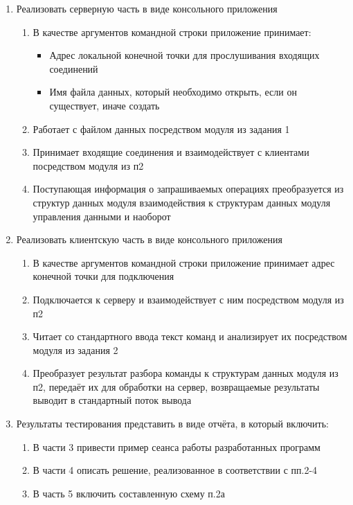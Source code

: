\documentclass[12pt,onecolumn]{article}
\begin{document}
\begin{enumerate}
  \item {
    Реализовать серверную часть в виде консольного приложения
    \begin{enumerate}
      \item В качестве аргументов командной строки приложение принимает:
      \begin{itemize}
        \item Адрес локальной конечной точки для прослушивания входящих соединений
        \item Имя файла данных, который необходимо открыть, если он существует, иначе создать
      \end{itemize}
      \item Работает с файлом данных посредством модуля из задания 1
      \item Принимает входящие соединения и взаимодействует с клиентами посредством модуля из п2
      \item Поступающая информация о запрашиваемых операциях преобразуется из структур данных модуля взаимодействия к структурам данных модуля управления данными и наоборот
    \end{enumerate}
  }

  \item {
    Реализовать клиентскую часть в виде консольного приложения
    \begin{enumerate}
      \item В качестве аргументов командной строки приложение принимает адрес конечной точки для подключения
      \item Подключается к серверу и взаимодействует с ним посредством модуля из п2
      \item Читает со стандартного ввода текст команд и анализирует их посредством модуля из задания 2
      \item Преобразует результат разбора команды к структурам данных модуля из п2, передаёт их для обработки на сервер, возвращаемые результаты выводит в стандартный поток вывода
    \end{enumerate}
  }

  \item {
    Результаты тестирования представить в виде отчёта, в который включить:
    \begin{enumerate}
      \item В части 3 привести пример сеанса работы разработанных программ
      \item В части 4 описать решение, реализованное в соответствии с пп.2-4
      \item В часть 5 включить составленную схему п.2а
    \end{enumerate}
  }

\end{enumerate}
\end{document}

